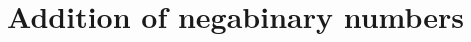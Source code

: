 \documentclass[11pt,a4paper]{article}
\author{Christian Rinderknecht}
\date{12 December 2007}
\begin{document}
\maketitle
\thispagestyle{empty}

\allowdisplaybreaks

\section{Addition of negabinary numbers}


\end{document}
